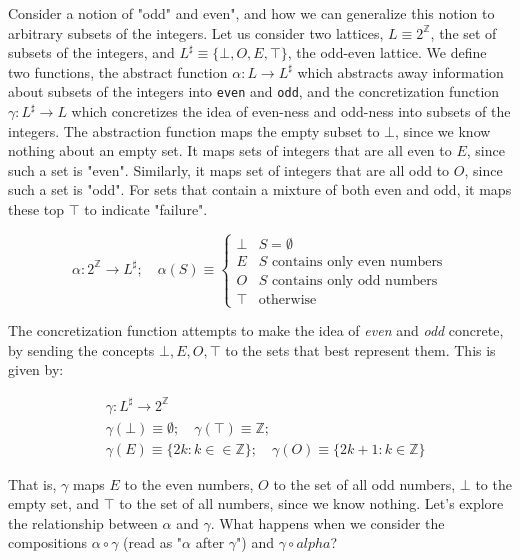 \documentclass[11pt]{book}
\newcommand{\Z}{\ensuremath{\mathbb Z}}
\begin{document}
Consider a notion of "odd" and even", and how we can generalize this notion to
arbitrary subsets of the integers.  Let us consider two lattices, $L \equiv
2^\Z$, the set of subsets of the integers, and $L^\sharp \equiv \{\bot, O, E,
\top\}$, the odd-even lattice. We define two functions, the abstract function
$\alpha: L \rightarrow L^\sharp$ which abstracts away information about subsets
of the integers into \texttt{even} and \texttt{odd}, and the concretization
function $\gamma: L^\sharp \rightarrow L$ which concretizes the idea of
even-ness and odd-ness into subsets of the integers. The abstraction function
maps the empty subset to $\bot$, since we know nothing about an empty set. It
maps sets of integers that are all even to $E$, since such a set is "even".
Similarly, it maps set of integers that are all odd to  $O$, since such a set
is "odd". For sets that contain a mixture of both even and odd, it maps these
top $\top$ to indicate "failure".

\[
	\alpha: 2^\Z\rightarrow L^\sharp; \quad
	\alpha(S) \equiv
	\begin{cases}
		\bot & S = \emptyset \\
		E & \text{$S$ contains only even numbers} \\
		O & \text{$S$ contains only odd numbers} \\
		\top & \text{otherwise}
	\end{cases}
\]

The concretization function attempts to make the idea of \emph{even} and
\emph{odd} concrete, by sending the concepts $\bot, E, O, \top$ to the sets
that best represent them. This is given by:

\begin{align*}
&\gamma: L^\sharp \rightarrow 2^\Z \\
&\gamma(\bot) \equiv \emptyset; \quad \gamma(\top) \equiv \Z; \\
&\gamma(E) \equiv \{ 2 k : k \in \in \Z\}; \quad
\gamma(O) \equiv \{ 2k + 1: k \in \Z \}
\end{align*}

That is, $\gamma$ maps $E$ to the even numbers, $O$ to the set of all odd
numbers, $\bot$ to the empty set, and $\top$ to the set of all numbers, since
we know nothing. Let's explore the relationship between $\alpha$ and $\gamma$.
What happens  when we consider the compositions $\alpha \circ \gamma$ (read as
"$\alpha$ after $\gamma$") and $\gamma \circ alpha$?
\end{document}
